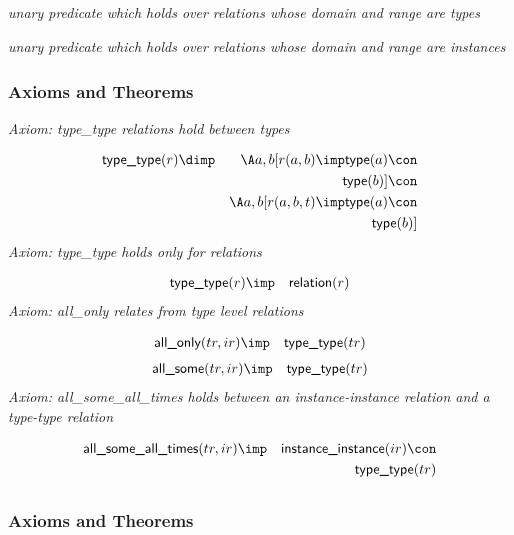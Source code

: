 \subsection{ }
\emph{unary predicate which holds over relations whose domain and range are types}

\emph{unary predicate which holds over relations whose domain and range are instances}

\subsubsection{Axioms and Theorems}


\emph{Axiom: type\_type relations hold between types}

\begin{eqnarray*}
 \pr{type\_type}(r) &\dimp & \A a, b[r(a, b) \imp  \pr{type}(a) \con \\
&& \pr{type}(b) ]\con \\
&& \A a, b[r(a, b, t) \imp  \pr{type}(a) \con \\
&& \pr{type}(b) ]
\end{eqnarray*}
\emph{Axiom: type\_type holds only for relations}

\begin{eqnarray*}
 \pr{type\_type}(r) &\imp & \pr{relation}(r) 
\end{eqnarray*}
\emph{Axiom: all\_only relates from type level relations}

\begin{eqnarray*}
 \pr{all\_only}(tr, ir) &\imp & \pr{type\_type}(tr) 
\end{eqnarray*}
\begin{eqnarray*}
 \pr{all\_some}(tr, ir) &\imp & \pr{type\_type}(tr) 
\end{eqnarray*}
\emph{Axiom: all\_some\_all\_times holds between an instance-instance relation and a type-type relation}

\begin{eqnarray*}
 \pr{all\_some\_all\_times}(tr, ir) &\imp & \pr{instance\_instance}(ir) \con \\
&& \pr{type\_type}(tr) 
\end{eqnarray*}

\subsection{ }
\subsubsection{Axioms and Theorems}


